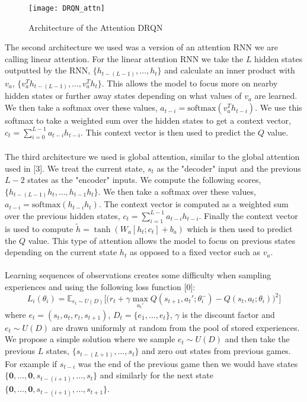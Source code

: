 \documentclass{article}
\begin{document}
\begin{figure}[h]
    \centering
    \texttt{[image: DRQN\_attn]}
    \caption{Architecture of the Attention DRQN}
\end{figure}

The second architecture we used was a version of an attention RNN we are calling
linear attention. For the linear attention RNN we take the $L$ hidden states
outputted by the RNN, $\{h_{t-(L-1)}, \dots, h_{t}\}$ and calculate an inner
product with $v_a$, $\{v_a^Th_{t-(L-1)}, \dots, v_a^Th_{t}\}$. This allows the
model to focus more on nearby hidden states or further away states depending on
what values of $v_a$ are learned. We then take a softmax over these values,
$a_{t-i} = \text{softmax}(v_a^Th_{t-i})$. We use this softmax to take a weighted
sum over the hidden states to get a context vector, $c_t = \sum_{i=0}^{L-1}a_{t-i}h_{t-i}$.
This context vector is then used to predict the $Q$ value. \\
\\
The third architecture we used is global attention, similar to the global attention
used in [3]. We treat the current state, $s_t$ as the "decoder" input and the
previous $L - 2$ states as the "encoder" inputs. We compute the following scores,
$\{h_{t-(L-1)}h_t, \dots, h_{t-1}h_t\}$. We then take a softmax over these values,
$a_{t-i} = \text{softmax}(h_{t-i}h_t)$. The context vector is computed as a weighted
sum over the previous hidden states, $c_t = \sum_{i=1}^{L-1}a_{t-i}h_{t-i}$.
Finally the context vector is used to compute $\tilde{h} = \tanh(W_a[h_t;c_t] + b_a)$
which is then used to predict the $Q$ value. This type of attention allows the model
to focus on previous states depending on the current state $h_t$ as opposed to a
fixed vector such as $v_a$.\\
\\
Learning sequences of observations creates some difficulty when sampling experiences
and using the following loss function [0]:
$$L_i(\theta_i) = \mathbb{E}_{e_t \sim U(D)}
\Big[\Big(
r_t + \gamma \max_{a_t'}Q(s_{t+1}, a_t'; \theta_i^-) -Q(s_t, a_t; \theta_i)
\Big)^2 \Big]$$
where $e_t = (s_t, a_t, r_t, s_{t+1})$, $D_t = \{e_1, \dots, e_t\}$, $\gamma$
is the discount factor and $e_t \sim U(D)$ are drawn uniformly at random from the
pool of stored experiences. We propose a simple solution where we sample $e_t
\sim U(D)$ and then take the previous $L$ states, $\{s_{t-(L+1)}, \dots, s_t\}$
and zero out states from previous games. For example if $s_{t-i}$ was the end of
the previous game then we would have states $\{\mathbf{0}, \dots, \mathbf{0},
s_{t-(i+1)}, \dots, s_t\}$ and similarly for the next state $\{\mathbf{0}, \dots,
\mathbf{0},s_{t-(i+1)}, \dots, s_{t+1}\}$.
\end{document}
